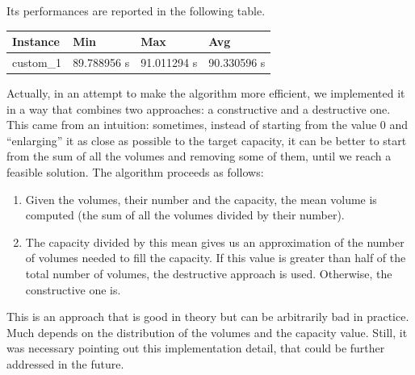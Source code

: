 \documentclass[12pt]{extarticle}
\begin{document}
Its performances are reported in the following table.
\begin{center}
\begin{tabular}{ | m{2.2cm} | m{2.2cm} | m{2.2cm} | m{2.2cm} |}
 \hline
 Instance & Min & Max & Avg\\
 \hline
 custom\_1 & 89.788956 s & 91.011294 s & 90.330596 s\\
 \hline

\end{tabular}
\end{center}
Actually, in an attempt to make the algorithm more efficient, we implemented it in a way that combines two approaches: a constructive and a destructive one. This came from an intuition: sometimes, instead of starting from the value 0 and ``enlarging'' it as close as possible to the target capacity, it can be better to start from the sum of all the volumes and removing some of them, until we reach a feasible solution.\newline
The algorithm proceeds as follows:
\begin{enumerate}
    \item Given the volumes, their number and the capacity, the mean volume is computed (the sum of all the volumes divided by their number).
    \item The capacity divided by this mean gives us an approximation of the number of volumes needed to fill the capacity. If this value is greater than half of the total number of volumes, the destructive approach is used. Otherwise, the constructive one is.
\end{enumerate}
This is an approach that is good in theory but can be arbitrarily bad in practice. Much depends on the distribution of the volumes and the capacity value. Still, it was necessary pointing out this implementation detail, that could be further addressed in the future. 
\end{document}
